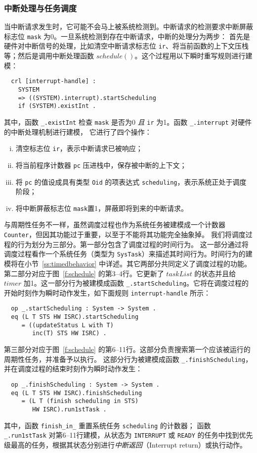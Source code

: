 \subsubsection{中断处理与任务调度}
\label{ss:inthandling}
当中断请求发生时，它可能不会马上被系统检测到。中断请求的检测要求中断屏蔽标志位
 \verb|mask| 为0。一旦系统检测到存在中断请求，中断的处理分为两步：
首先是硬件对中断信号的处理，比如清空中断请求标志位 \verb|ir|、将当前函数的上下文压栈等；然后是调用中断处理函数 $\mathit{schedule()}$。这个过程用以下瞬时重写规则进行建模：
\begin{verbatim}
  crl [interrupt-handle] :
    SYSTEM 
    => ((SYSTEM).interrupt).startScheduling
    if (SYSTEM).existInt .
\end{verbatim}
其中，函数 \verb|_.existInt| 检查 \verb|mask| 是否为0
\emph{且} \verb|ir| 为1。函数 \verb|_.interrupt| 对硬件的中断处理机制进行建模，
它进行了四个操作：
\begin{enumerate}[(i)]
\item 清空标志位 \verb|ir|，表示中断请求已被响应；
\item 将当前程序计数器 \verb|pc| 压进栈中，保存被中断的上下文；
\item 将 \verb|pc| 的值设成具有类型 \verb|Oid| 的项表达式 \verb|scheduling|，表示系统正处于调度阶段；
\item 将中断屏蔽标志位 \verb|mask|置1，屏蔽即将到来的中断请求。
\end{enumerate}

与周期性任务不一样，虽然调度过程也作为系统任务被建模成一个计数器
\verb|Counter|，但因其功能过于重要，以至于不能将其功能完全抽象掉。
我们将调度过程的行为划分为三部分。第一部分包含了调度过程的时间行为。
这一部分通过将调度过程看作一个系统任务（类型为 \verb|SysTask|）来描述其时间行为。时间行为的建模将在小节~\ref{ss:timedbehavior} 中详述。其它两部分共同定义了调度过程的功能。
第二部分对应于图~\ref{f:schedule} 的第3--4行。它更新了 $\mathit{taskList}$ 的状态并且给 $\mathit{timer}$ 加1。这一部分行为被建模成函数 \verb|_.startScheduling|。它将在调度过程的开始时刻作为瞬时动作发生，如下面规则 \verb|interrupt-handle| 所示：
\begin{verbatim}
  op _.startScheduling : System -> System .
  eq (L T STS HW ISRC).startScheduling 
     = ((updateStatus L with T) 
        inc(T) STS HW ISRC) .
\end{verbatim}
第三部分对应于图~\ref{f:schedule} 的第6--11行。这部分负责搜索第一个应该被运行的周期性任务，并准备予以执行。
这部分行为被建模成函数 \verb|_.finishScheduling|，并在调度过程的结束时刻作为瞬时动作发生：
\begin{verbatim}
  op _.finishScheduling : System -> System .
  eq (L T STS HW ISRC).finishScheduling
     = (L T (finish scheduling in STS) 
        HW ISRC).run1stTask .
\end{verbatim}
其中，函数 \verb|finish_in_| 重置系统任务 \verb|scheduling| 的计数器；
函数 \verb|_.run1stTask| 对第6--11行建模，从状态为
\verb|INTERRUPT| 或 \verb|READY| 的任务中找到优先级最高的任务，根据其状态分别进行\emph{中断返回}（Interrupt return）或执行动作。

